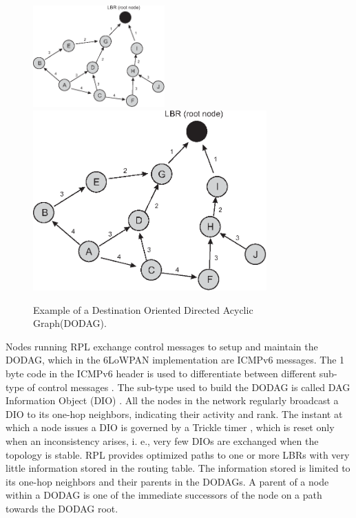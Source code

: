 \documentclass[final,authoryear,3p,twocolumn]{elsarticle}
\begin{document}
\begin{figure}[h!tb]
\centering
\ifdefined\TWOCOL
\includegraphics[width=0.45\textwidth]{figures/RPL_DIO}
\else
\includegraphics[width=0.8\textwidth]{figures/RPL_DIO}
\fi
\caption{Example of a Destination Oriented Directed Acyclic Graph(DODAG).}
\label{RPL_DIO}
\end{figure}

Nodes running RPL exchange control messages to setup and maintain the DODAG, which in the 6LoWPAN implementation are ICMPv6 messages. The 1 byte code in the ICMPv6 header is used to differentiate between different sub-type of control messages \citep{RFC4443}. The sub-type used to build the DODAG is called DAG Information Object (DIO) \citep{RFC6550}. All the nodes in the network regularly broadcast a DIO to its one-hop neighbors, indicating their activity and rank. The instant at which a node issues a DIO is governed by a Trickle timer \citep{trickle}, which is reset only when an inconsistency arises, i. e., very few DIOs are exchanged when the topology is stable. RPL provides optimized paths to one or more LBRs with very little information stored in the routing table. The information stored is limited to its one-hop neighbors and their parents in the DODAGs. A parent of a node within a DODAG is one of the immediate successors of the node on a path towards the DODAG root.
\end{document}
